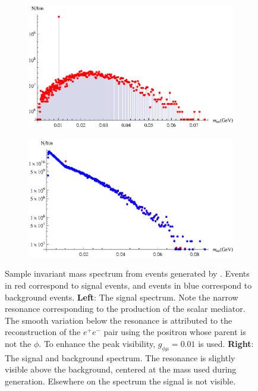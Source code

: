 \begin{figure}[t]
    \centering
    \begin{subfigure}[b]{0.45\textwidth}
        \centering
        \includegraphics[width=\textwidth]{Figures/spectra/mu_eeenunu_scalar}
        \label{fig:mu_eeenunu_scalar_spectrum}
    \end{subfigure}
    \begin{subfigure}[b]{0.45\textwidth}
        \centering
        \includegraphics[width=\textwidth]{Figures/spectra/mu_eeenunu_scalar_background}
        \label{fig:mu_eeenunu_scalar_background_spectrum}
    \end{subfigure}
    \caption[Sample invariant mass spectrum from events generated by \madgraph.]{Sample invariant mass spectrum from events generated by \madgraph. Events in red correspond to signal events, and events in blue correspond to background events.
            \textbf{Left}: The signal spectrum. Note the narrow resonance corresponding to the production of the scalar mediator. The smooth variation below the resonance is attributed to the reconstruction of the $e^+e^-$ pair using the positron whose parent is not the $\phi$. To enhance the peak visibility, $g_{\phi\mu} = 0.01$ is used.
            \textbf{Right}: The signal and background spectrum. The resonance is slightly visible above the background, centered at the mass used during generation. Elsewhere on the spectrum the signal is not visible.}
    \label{fig:mu_eeenunu_spectrum}
\end{figure}

